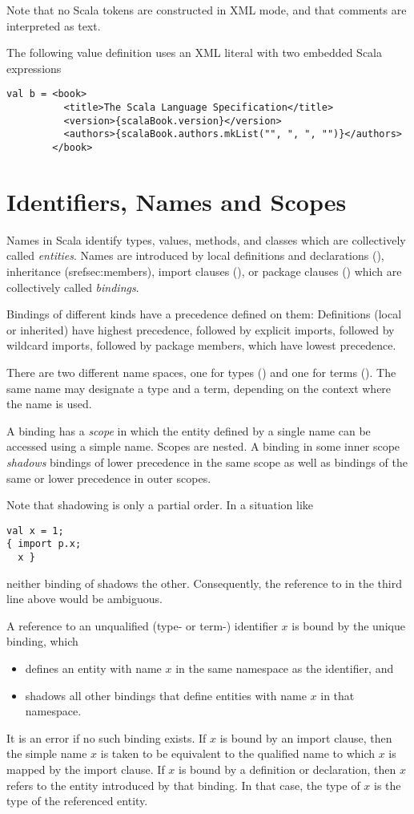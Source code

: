 Note that no Scala tokens are constructed in XML mode, and that comments are interpreted
as text.

\example 
The following value definition uses an XML literal with two embedded
Scala expressions
\begin{lstlisting}
val b = <book>
          <title>The Scala Language Specification</title>
          <version>{scalaBook.version}</version>
          <authors>{scalaBook.authors.mkList("", ", ", "")}</authors>
        </book>
\end{lstlisting}

\chapter{\label{sec:names}Identifiers, Names and Scopes}

Names in Scala identify types, values, methods, and classes which are
collectively called {\em entities}. Names are introduced by local
definitions and declarations (), inheritance (sref{sec:members}),
import clauses (), or package clauses
() which are collectively called {\em
bindings}.

Bindings of different kinds have a precedence defined on them:
Definitions (local or inherited) have highest precedence, followed by
explicit imports, followed by wildcard imports, followed by package
members, which have lowest precedence.

There are two different name spaces, one for types ()
and one for terms ().  The same name may designate a
type and a term, depending on the context where the name is used.

A binding has a {\em scope} in which the entity defined by a single
name can be accessed using a simple name. Scopes are nested.  A binding
in some inner scope {\em shadows} bindings of lower precedence in the
same scope as well as bindings of the same or lower precedence in outer
scopes. 

Note that shadowing is only a partial order. In a situation like
\begin{lstlisting}
val x = 1;
{ import p.x; 
  x }
\end{lstlisting}
neither binding of  shadows the other. Consequently, the
reference to  in the third line above would be ambiguous.

A reference to an unqualified (type- or term-) identifier $x$ is bound
by the unique binding, which
\begin{itemize}
\item defines an entity with name $x$ in the same namespace as the
identifier, and
\item shadows all other bindings that define entities with name $x$ in that namespace.
\end{itemize}
It is an error if no such binding exists.  If $x$ is bound by an
import clause, then the simple name $x$ is taken to be equivalent to
the qualified name to which $x$ is mapped by the import clause. If $x$
is bound by a definition or declaration, then $x$ refers to the entity
introduced by that binding. In that case, the type of $x$ is the type
of the referenced entity.

